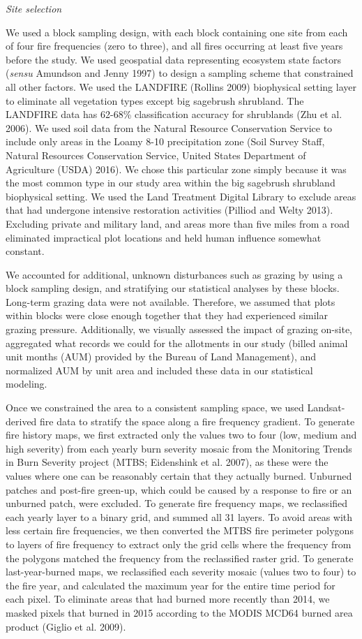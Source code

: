 \documentclass[12pt,]{article}
\begin{document}
\emph{Site selection}

We used a block sampling design, with each block containing one site
from each of four fire frequencies (zero to three), and all fires
occurring at least five years before the study. We used geospatial data
representing ecosystem state factors (\emph{sensu} Amundson and Jenny
1997) to design a sampling scheme that constrained all other factors. We
used the LANDFIRE (Rollins 2009) biophysical setting layer to eliminate
all vegetation types except big sagebrush shrubland. The LANDFIRE data
has 62-68\% classification accuracy for shrublands (Zhu et al. 2006). We
used soil data from the Natural Resource Conservation Service to include
only areas in the Loamy 8-10 precipitation zone (Soil Survey Staff,
Natural Resources Conservation Service, United States Department of
Agriculture (USDA) 2016). We chose this particular zone simply because
it was the most common type in our study area within the big sagebrush
shrubland biophysical setting. We used the Land Treatment Digital
Library to exclude areas that had undergone intensive restoration
activities (Pilliod and Welty 2013). Excluding private and military
land, and areas more than five miles from a road eliminated impractical
plot locations and held human influence somewhat constant.

We accounted for additional, unknown disturbances such as grazing by
using a block sampling design, and stratifying our statistical analyses
by these blocks. Long-term grazing data were not available. Therefore,
we assumed that plots within blocks were close enough together that they
had experienced similar grazing pressure. Additionally, we visually
assessed the impact of grazing on-site, aggregated what records we could
for the allotments in our study (billed animal unit months (AUM)
provided by the Bureau of Land Management), and normalized AUM by unit
area and included these data in our statistical modeling.

Once we constrained the area to a consistent sampling space, we used
Landsat-derived fire data to stratify the space along a fire frequency
gradient. To generate fire history maps, we first extracted only the
values two to four (low, medium and high severity) from each yearly burn
severity mosaic from the Monitoring Trends in Burn Severity project
(MTBS; Eidenshink et al. 2007), as these were the values where one can
be reasonably certain that they actually burned. Unburned patches and
post-fire green-up, which could be caused by a response to fire or an
unburned patch, were excluded. To generate fire frequency maps, we
reclassified each yearly layer to a binary grid, and summed all 31
layers. To avoid areas with less certain fire frequencies, we then
converted the MTBS fire perimeter polygons to layers of fire frequency
to extract only the grid cells where the frequency from the polygons
matched the frequency from the reclassified raster grid. To generate
last-year-burned maps, we reclassified each severity mosaic (values two
to four) to the fire year, and calculated the maximum year for the
entire time period for each pixel. To eliminate areas that had burned
more recently than 2014, we masked pixels that burned in 2015 according
to the MODIS MCD64 burned area product (Giglio et al. 2009).
\end{document}
